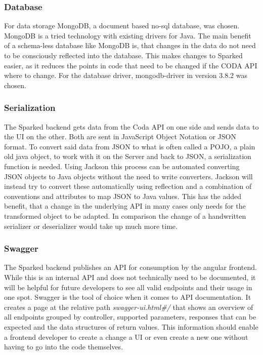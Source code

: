 \subsubsection{Database}
For data storage MongoDB, a document based no-sql database, was chosen. MongoDB is a tried technology with existing drivers for Java. The main benefit of a schema-less database like MongoDB is, that changes in the data do not need to be consciously reflected into the database. This makes changes to Sparked easier, as it reduces the points in code that need to be changed if the CODA API where to change. For the database driver, mongodb-driver in version 3.8.2 was chosen.
\subsubsection{Serialization}
The Sparked backend gets data from the Coda API on one side and sends data to the UI on the other. Both are sent in JavaScript Object Notation or JSON format. To convert said data from JSON to what is often called a POJO, a plain old java object, to work with it on the Server and back to JSON, a serialization function is needed. Using Jackson this process can be automated converting JSON objects to Java objects without the need to write converters. Jackson will instead try to convert these automatically using reflection and a combination of conventions and attributes to map JSON to Java values. This has the added benefit, that a change in the underlying API in many cases only needs for the transformed object to be adapted. In comparison the change of a handwritten serializer or deserializer would take up much more time. 
\subsubsection{Swagger}
The Sparked backend publishes an API for consumption by the angular frontend. While this is an internal API and does not technically need to be documented, it will be helpful for future developers to see all valid endpoints and their usage in one spot. Swagger is the tool of choice when it comes to API documentation. It creates a page at the relative path \textit{\/swagger-ui.html\#/} that shows an overview of all endpoints grouped by controller, supported parameters, responses that can be expected and the data structures of return values. This information should enable a frontend developer to create a change a UI or even create a new one without having to go into the code themselves. 
 
